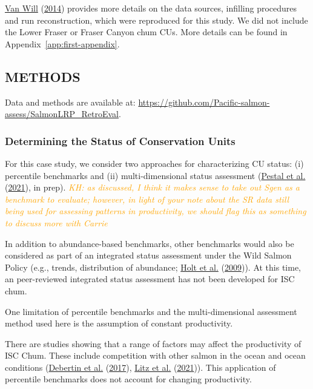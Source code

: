 \documentclass[11pt]{book}
\begin{document}
\protect\hyperlink{ref-vanwillInnerSouthCoast2014}{Van Will} (\protect\hyperlink{ref-vanwillInnerSouthCoast2014}{2014}) provides more details on the data sources, infilling procedures and run reconstruction, which were reproduced for this study. We did not include the Lower Fraser or Fraser Canyon chum CUs. More details can be found in Appendix~\ref{app:first-appendix}.

\hypertarget{methods-4}{%
\subsection{METHODS}\label{methods-4}}

Data and methods are available at: \url{https://github.com/Pacific-salmon-assess/SalmonLRP_RetroEval}.

\hypertarget{determining-the-status-of-conservation-units}{%
\subsubsection{Determining the Status of Conservation Units}\label{determining-the-status-of-conservation-units}}

For this case study, we consider two approaches for characterizing CU status: (i) percentile benchmarks and (ii) multi-dimensional status assessment (\protect\hyperlink{ref-pestalAlgorithmsRapidStatus2021}{Pestal et al.} (\protect\hyperlink{ref-pestalAlgorithmsRapidStatus2021}{2021}), in prep). \emph{\textcolor{orange}{KH: as discussed, I think it makes sense to take out Sgen as a benchmark to evaluate; however, in light of your note about the SR data still being used for assessing patterns in productivity, we should flag this as something to discuss more with Carrie}}

In addition to abundance-based benchmarks, other benchmarks would also be considered as part of an integrated status assessment under the Wild Salmon Policy (e.g., trends, distribution of abundance; \protect\hyperlink{ref-holtIndicatorsStatusBenchmarks2009}{Holt et al.} (\protect\hyperlink{ref-holtIndicatorsStatusBenchmarks2009}{2009})). At this time, an peer-reviewed integrated status assessment has not been developed for ISC chum.

One limitation of percentile benchmarks and the multi-dimensional assessment method used here is the assumption of constant productivity.

There are studies showing that a range of factors may affect the productivity of ISC Chum. These include competition with other salmon in the ocean and ocean conditions (\protect\hyperlink{ref-debertinMarineGrowthPatterns2017}{Debertin et al.} (\protect\hyperlink{ref-debertinMarineGrowthPatterns2017}{2017}), \protect\hyperlink{ref-litzCompetitionOddyearPink2021}{Litz et al.} (\protect\hyperlink{ref-litzCompetitionOddyearPink2021}{2021})). This application of percentile benchmarks does not account for changing productivity.
\end{document}

